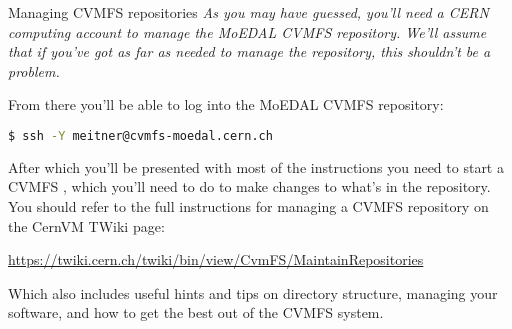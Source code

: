 \begin{warningbox}{Managing CVMFS repositories}
\emph{As you may have guessed, you'll need a CERN computing account
to manage the MoEDAL CVMFS repository. We'll assume that if you've
got as far as needed to manage the repository, this shouldn't be
a problem.}
\end{warningbox}

From there you'll be able to log into the MoEDAL \ac{CVMFS} repository:

\begin{lstlisting}[gobble=0,numbers=none,language=bash]
$ ssh -Y meitner@cvmfs-moedal.cern.ch
\end{lstlisting}

After which you'll be presented with most of the instructions you need
to start a \acs{CVMFS} ,
which you'll need to do to make changes to what's in the repository.
You should refer to the full instructions for managing
a \ac{CVMFS} repository on the CernVM TWiki page:

\href{https://twiki.cern.ch/twiki/bin/view/CvmFS/MaintainRepositories}{https://twiki.cern.ch/twiki/bin/view/CvmFS/MaintainRepositories}

Which also includes useful hints and tips on directory structure,
managing your software, and how to get the best out of the
\ac{CVMFS} system.
